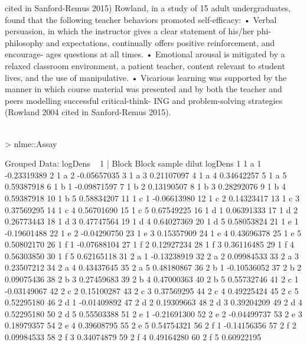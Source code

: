 \documentclass{article}
\begin{document}
                                                   cited in Sanford-Remus 2015)
 Rowland, in a study of 15 adult undergraduates, found that the following teacher
 behaviors promoted self-efficacy:
   • Verbal persuasion, in which the instructor gives a clear statement of his/her phi-
   philosophy and expectations, continually offers positive reinforcement, and encourage-
   ages questions at all times.
 • Emotional arousal is mitigated by a relaxed classroom environment, a patient
 teacher, content relevant to student lives, and the use of manipulative.
 • Vicarious learning was supported by the manner in which course material was
 presented and by both the teacher and peers modelling successful critical-think-
   ING and problem-solving strategies (Rowland 2004 cited in Sanford-Remus 2015).
\textit{\\\\}
\begin{Schunk}
\begin{Sinput}
> nlme::Assay
\end{Sinput}
\begin{Soutput}
Grouped Data: logDens ~ 1 | Block
   Block sample dilut     logDens
1      1      a     1 -0.23319389
2      1      a     2 -0.05657035
3      1      a     3  0.21107097
4      1      a     4  0.34642257
5      1      a     5  0.59387918
6      1      b     1 -0.09871597
7      1      b     2  0.13190507
8      1      b     3  0.28292076
9      1      b     4  0.59387918
10     1      b     5  0.58834207
11     1      c     1 -0.06613980
12     1      c     2  0.14323417
13     1      c     3  0.37569295
14     1      c     4  0.56701690
15     1      c     5  0.67549225
16     1      d     1  0.06391333
17     1      d     2  0.26773443
18     1      d     3  0.47747564
19     1      d     4  0.64027369
20     1      d     5  0.58053824
21     1      e     1 -0.19601488
22     1      e     2 -0.04290750
23     1      e     3  0.15357909
24     1      e     4  0.43696378
25     1      e     5  0.50802170
26     1      f     1 -0.07688104
27     1      f     2  0.12927234
28     1      f     3  0.36116485
29     1      f     4  0.56303850
30     1      f     5  0.62165118
31     2      a     1 -0.13238919
32     2      a     2  0.09984533
33     2      a     3  0.23507212
34     2      a     4  0.43437645
35     2      a     5  0.48180867
36     2      b     1 -0.10536052
37     2      b     2  0.09075436
38     2      b     3  0.27459683
39     2      b     4  0.47000363
40     2      b     5  0.55732746
41     2      c     1 -0.03149067
42     2      c     2  0.15100287
43     2      c     3  0.37569295
44     2      c     4  0.49225424
45     2      c     5  0.52295180
46     2      d     1 -0.01409892
47     2      d     2  0.19309663
48     2      d     3  0.39204209
49     2      d     4  0.52295180
50     2      d     5  0.55503388
51     2      e     1 -0.21691300
52     2      e     2 -0.04499737
53     2      e     3  0.18979357
54     2      e     4  0.39608795
55     2      e     5  0.54754321
56     2      f     1 -0.14156356
57     2      f     2  0.09984533
58     2      f     3  0.34074879
59     2      f     4  0.49164280
60     2      f     5  0.60922195
\end{Soutput}
\end{Schunk}
\end{document}
